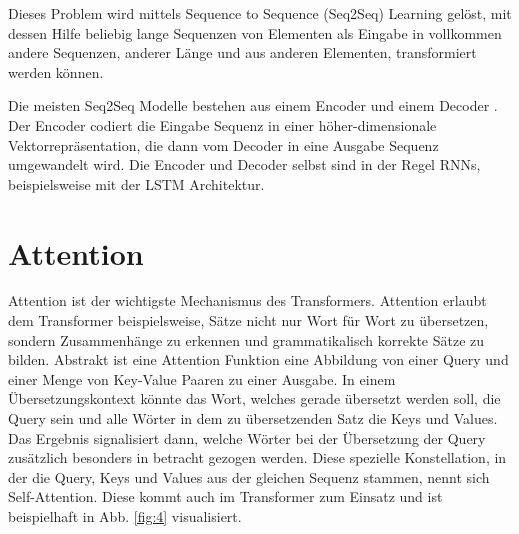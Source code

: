 \documentclass[conference]{IEEEtran}
\begin{document}
Dieses Problem wird mittels Sequence to Sequence (Seq2Seq) Learning gelöst, mit dessen Hilfe beliebig lange Sequenzen von Elementen als Eingabe in vollkommen andere Sequenzen, anderer Länge und aus anderen Elementen, transformiert werden können. \cite{sequence_to_sequence}

Die meisten Seq2Seq Modelle bestehen aus einem Encoder und einem Decoder \cite{attention_is_all_you_need}. Der Encoder codiert die Eingabe Sequenz in einer höher-dimensionale Vektorrepräsentation, die dann vom Decoder in eine Ausgabe Sequenz umgewandelt wird. Die Encoder und Decoder selbst sind in der Regel RNNs, beispielsweise mit der LSTM Architektur.



\section{Attention}
Attention ist der wichtigste Mechanismus des Transformers. Attention erlaubt dem Transformer beispielsweise, Sätze nicht nur Wort für Wort zu übersetzen, sondern Zusammenhänge zu erkennen und grammatikalisch korrekte Sätze zu bilden. Abstrakt ist eine Attention Funktion eine Abbildung von einer Query und einer Menge von Key-Value Paaren zu einer Ausgabe. In einem Übersetzungskontext könnte das Wort, welches gerade übersetzt werden soll, die Query sein und alle Wörter in dem zu übersetzenden Satz die Keys und Values. Das Ergebnis signalisiert dann, welche Wörter bei der Übersetzung der Query zusätzlich besonders in betracht gezogen werden. Diese spezielle Konstellation, in der die Query, Keys und Values aus der gleichen Sequenz stammen, nennt sich Self-Attention. Diese kommt auch im Transformer zum Einsatz und ist beispielhaft in Abb. \ref{fig:4} visualisiert.
\end{document}
